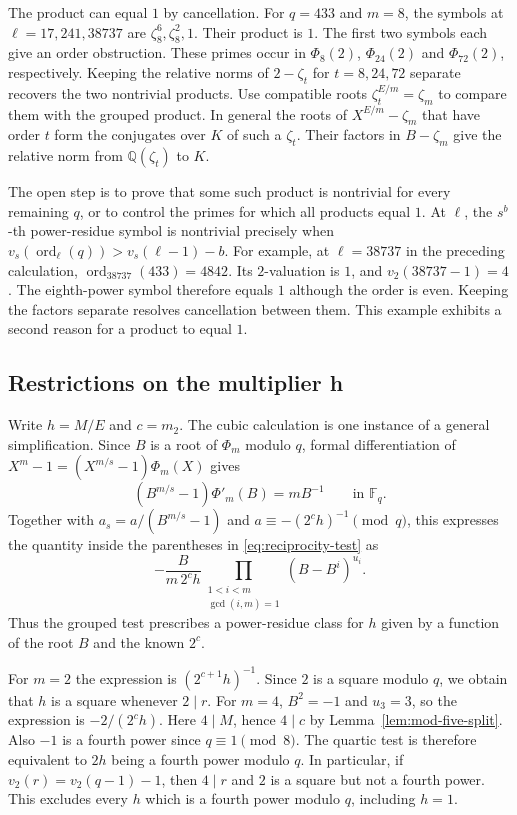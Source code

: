 \documentclass[11pt]{article}
\begin{document}
The product can equal $1$ by cancellation. For $q=433$ and $m=8$,
the symbols at $\ell=17,241,38737$ are $\zeta_8^6,\zeta_8^2,1$.
Their product is $1$. The first two symbols each give an order
obstruction. These primes occur in $\Phi_8(2)$, $\Phi_{24}(2)$
and $\Phi_{72}(2)$, respectively. Keeping the relative norms
of $2-\zeta_t$ for $t=8,24,72$ separate recovers the two nontrivial
products. Use compatible roots $\zeta_t^{E/m}=\zeta_m$ to compare
them with the grouped product. In general the roots of
$X^{E/m}-\zeta_m$ that have order $t$ form the conjugates over
$K$ of such a $\zeta_t$. Their factors in $B-\zeta_m$ give the
relative norm from $\mathbb Q(\zeta_t)$ to $K$.

The open step is to prove that some such product is nontrivial
for every remaining $q$, or to control the primes for which all
products equal $1$. At $\ell$, the $s^b$-th power-residue
symbol is nontrivial precisely when
$v_s(\operatorname{ord}_\ell(q))>v_s(\ell-1)-b$.
For example, at $\ell=38737$ in the preceding calculation,
$\operatorname{ord}_{38737}(433)=4842$. Its $2$-valuation is $1$,
and $v_2(38737-1)=4$. The eighth-power symbol therefore equals $1$
although the order is even. Keeping the factors separate resolves
cancellation between them. This example exhibits a second reason
for a product to equal $1$.

\subsection{Restrictions on the multiplier h}
\label{sec:reciprocity-h}

Write $h=M/E$ and $c=m_2$. The cubic calculation is one instance
of a general simplification. Since $B$ is a root of $\Phi_m$
modulo $q$, formal differentiation of
$X^m-1=(X^{m/s}-1)\Phi_m(X)$ gives
\[
(B^{m/s}-1)\Phi'_m(B)=mB^{-1}\qquad\text{in }\mathbb F_q.
\]
Together with $a_s=a/(B^{m/s}-1)$ and
$a\equiv-(2^ch)^{-1}\pmod q$, this expresses the quantity inside
the parentheses in \eqref{eq:reciprocity-test} as
\[
-\frac{B}{m\,2^c h}
\prod_{\substack{1<i<m\\\gcd(i,m)=1}}(B-B^i)^{u_i}.
\]
Thus the grouped test prescribes a power-residue class for $h$
given by a function of the root $B$ and the known $2^c$.

For $m=2$ the expression is $(2^{c+1}h)^{-1}$. Since $2$ is
a square modulo $q$, we obtain that $h$ is a square whenever
$2\mid r$. For $m=4$, $B^2=-1$ and $u_3=3$, so the expression is
$-2/(2^ch)$. Here $4\mid M$, hence $4\mid c$ by
Lemma~\ref{lem:mod-five-split}. Also $-1$ is a fourth power since
$q\equiv1\pmod8$. The quartic test is therefore equivalent to
$2h$ being a fourth power modulo $q$.
In particular, if $v_2(r)=v_2(q-1)-1$, then $4\mid r$ and $2$ is
a square but not a fourth power. This excludes every $h$ which
is a fourth power modulo $q$, including $h=1$.
\end{document}
